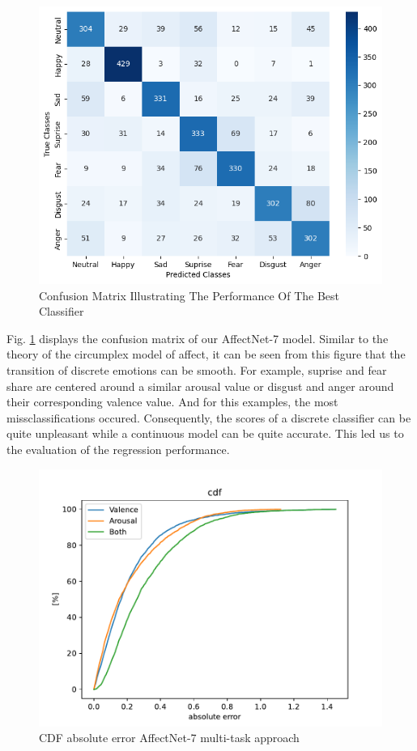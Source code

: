 \documentclass[conference]{IEEEtran}
\begin{document}
\begin{figure}[h]
    \centering
    \includegraphics[width = \columnwidth]{pictures/confusion_7VA.png}
    \caption{Confusion Matrix Illustrating The Performance Of The Best Classifier}
    \label{fig:confusion_matrix_classifier}
\end{figure}

Fig. \ref{fig:confusion_matrix_classifier} displays the confusion matrix of our AffectNet-7 model. Similar to the  theory of the circumplex model of affect, it can be seen from this figure that the transition of discrete emotions can be smooth. For example, suprise and fear share are centered around a similar arousal value or disgust and anger around their corresponding valence value. And for this examples, the most missclassifications occured. Consequently, the scores of a discrete classifier can be quite unpleasant while a continuous model can be quite accurate. This led us to the evaluation of the regression performance. \\

\begin{figure}[ht]
    \centering
    \includegraphics[width=\columnwidth]{pictures/affectnet/affectnet_cdf.pdf}
    \caption{CDF absolute error AffectNet-7 multi-task approach}
    \label{fig:affectnet_cdf}
\end{figure}
\end{document}
